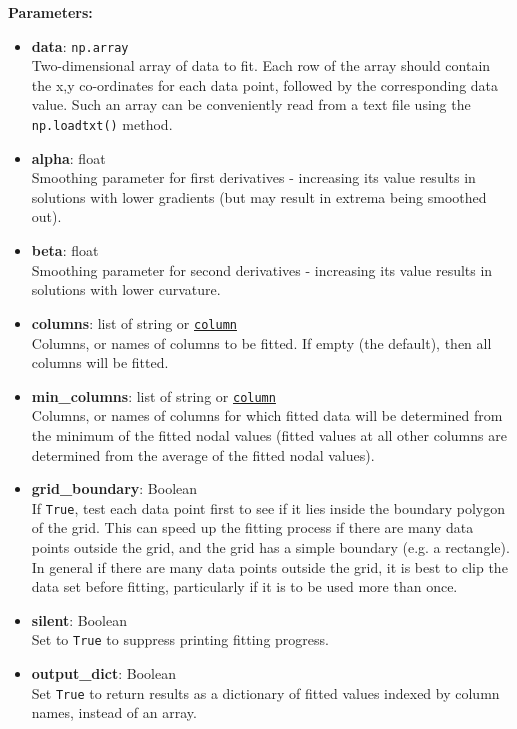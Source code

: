 \textbf{Parameters:}
\begin{itemize}
\item \textbf{data}: \texttt{np.array}\\
  Two-dimensional array of data to fit.  Each row of the array should contain the x,y co-ordinates for each data point, followed by the corresponding data value.  Such an array can be conveniently read from a text file using the \texttt{np.loadtxt()} method.
\item \textbf{alpha}: float\\
  Smoothing parameter for first derivatives - increasing its value results in solutions with lower gradients (but may result in extrema being smoothed out).
\item \textbf{beta}: float\\
  Smoothing parameter for second derivatives - increasing its value results in solutions with lower curvature.
\item \textbf{columns}: list of string or \hyperref[columnobjects]{\texttt{column}}\\
  Columns, or names of columns to be fitted.  If empty (the default), then all columns will be fitted.
\item \textbf{min\_columns}: list of string or \hyperref[columnobjects]{\texttt{column}}\\
  Columns, or names of columns for which fitted data will be determined from the minimum of the fitted nodal values (fitted values at all other columns are determined from the average of the fitted nodal values).
\item \textbf{grid\_boundary}: Boolean\\
  If \texttt{True}, test each data point first to see if it lies inside the boundary polygon of the grid.  This can speed up the fitting process if there are many data points outside the grid, and the grid has a simple boundary (e.g. a rectangle).  In general if there are many data points outside the grid, it is best to clip the data set before fitting, particularly if it is to be used more than once.
\item \textbf{silent}: Boolean\\
  Set to \texttt{True} to suppress printing fitting progress.
\item \textbf{output\_dict}: Boolean\\
  Set \texttt{True} to return results as a dictionary of fitted values indexed by column names, instead of an array.
\end{itemize}

